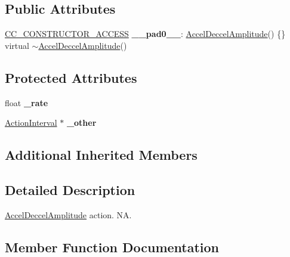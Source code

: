 \subsection*{Public Attributes}
\begin{DoxyCompactItemize}
\item 
\mbox{\label{classAccelDeccelAmplitude_aafe479c83c4a31c3b17250ec573ea23d}} 
\hyperlink{_2cocos2d_2cocos_2base_2ccConfig_8h_a25ef1314f97c35a2ed3d029b0ead6da0}{C\+C\+\_\+\+C\+O\+N\+S\+T\+R\+U\+C\+T\+O\+R\+\_\+\+A\+C\+C\+E\+SS} {\bfseries \+\_\+\+\_\+pad0\+\_\+\+\_\+}\+: \hyperlink{classAccelDeccelAmplitude}{Accel\+Deccel\+Amplitude}() \{\} virtual $\sim$\hyperlink{classAccelDeccelAmplitude}{Accel\+Deccel\+Amplitude}()
\end{DoxyCompactItemize}
\subsection*{Protected Attributes}
\begin{DoxyCompactItemize}
\item 
\mbox{\label{classAccelDeccelAmplitude_a71d14633b9ff4c5d56bf8328a7afcd39}} 
float {\bfseries \+\_\+rate}
\item 
\mbox{\label{classAccelDeccelAmplitude_aa7a576dc3f274cd30a313ec1d7f3db5a}} 
\hyperlink{classActionInterval}{Action\+Interval} $\ast$ {\bfseries \+\_\+other}
\end{DoxyCompactItemize}
\subsection*{Additional Inherited Members}


\subsection{Detailed Description}
\hyperlink{classAccelDeccelAmplitude}{Accel\+Deccel\+Amplitude} action.  NA. 

\subsection{Member Function Documentation}
\mbox{\label{classAccelDeccelAmplitude_af2ced484fb1b0116de6ed8f787247805}} 
